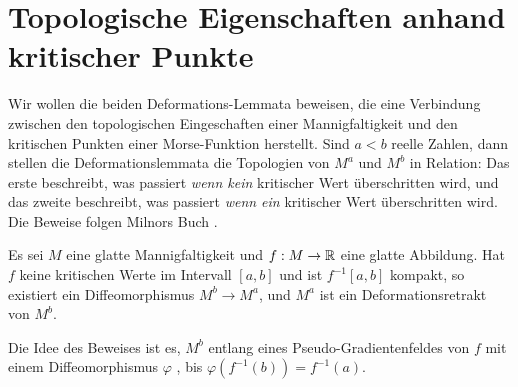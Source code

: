 \section{Topologische Eigenschaften anhand kritischer Punkte}
\label{sec: topologische eigenschaften anhand kritischer punkte}

Wir wollen die beiden Deformations-Lemmata beweisen, die eine Verbindung zwischen den topologischen
Eingeschaften einer Mannigfaltigkeit und den kritischen Punkten einer Morse-Funktion herstellt.
Sind $a < b$ reelle Zahlen, dann stellen die Deformationslemmata die Topologien von $M^a$ und $M^b$ 
in Relation: Das erste beschreibt, was passiert \textit{wenn kein} kritischer Wert überschritten wird, 
und das zweite beschreibt, was passiert \textit{wenn ein} kritischer Wert überschritten wird. Die 
Beweise folgen Milnors Buch 
\cite{morse}. \\

\begin{theorem}
    \label{satz: erstes deformationslemma}
    Es sei $M$ eine glatte Mannigfaltigkeit und $f: M \rightarrow { \mathbb R }$ eine
    glatte Abbildung. Hat $f$ keine kritischen Werte im Intervall $[a, b]$ und 
    ist $f^{-1}[a, b]$ kompakt, so existiert ein Diffeomorphismus 
    $M^b \rightarrow M^a$, und $M^a$ ist ein Deformationsretrakt von $M^b$.
\end{theorem}

Die Idee des Beweises ist es, $M^b$ entlang eines Pseudo-Gradientenfeldes von $f$ mit einem 
Diffeomorphismus $\varphi$ , bis $\varphi(f^{-1}(b)) = f^{-1}(a)$.

